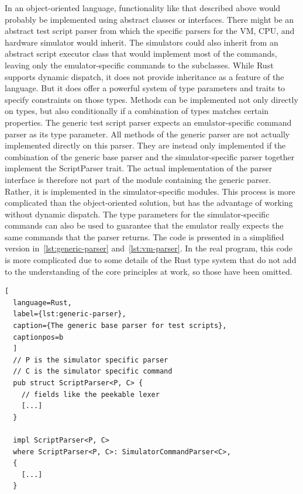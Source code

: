 In an object-oriented language, functionality like that described above would probably be implemented using abstract classes or interfaces.
There might be an abstract test script parser from which the specific parsers for the VM, CPU, and hardware simulator would inherit.
The simulators could also inherit from an abstract script executor class that would implement most of the commands, leaving only the emulator-specific commands to the subclasses.
While Rust supports dynamic dispatch, it does not provide inheritance as a feature of the language.
But it does offer a powerful system of type parameters and traits to specify constraints on those types.
Methods can be implemented not only directly on types, but also conditionally if a combination of types matches certain properties.
The generic test script parser expects an emulator-specific command parser as its type parameter.
All methods of the generic parser are not actually implemented directly on this parser.
They are instead only implemented if the combination of the generic base parser and the simulator-specific parser together implement the ScriptParser trait.
The actual implementation of the parser interface is therefore not part of the module containing the generic parser.
Rather, it is implemented in the simulator-specific modules.
This process is more complicated than the object-oriented solution, but has the advantage of working without dynamic dispatch.
The type parameters for the simulator-specific commands can also be used to guarantee that the emulator really expects the same commands that the parser returns.
The code is presented in a simplified version in~\cref{lst:generic-parser} and~\cref{lst:vm-parser}.
In the real program, this code is more complicated due to some details of the Rust type system that do not add to the understanding of the core principles at work, so those have been omitted.

\begin{lstlisting}[
  language=Rust,
  label={lst:generic-parser},
  caption={The generic base parser for test scripts},
  captionpos=b
  ]
  // P is the simulator specific parser
  // C is the simulator specific command
  pub struct ScriptParser<P, C> {
    // fields like the peekable lexer
    [...]
  }

  impl ScriptParser<P, C>
  where ScriptParser<P, C>: SimulatorCommandParser<C>,
  {
    [...]
  }
\end{lstlisting}


